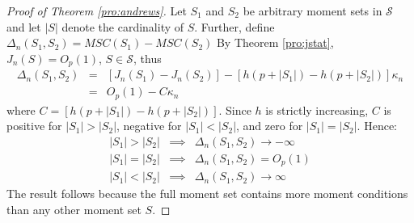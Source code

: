 \begin{proof}[Proof of Theorem \ref{pro:andrews}]
Let $S_1$ and $S_2$ be arbitrary moment sets in $\mathscr{S}$ and let $|S|$ denote the cardinality of $S$. 
Further, define $\Delta_n(S_1, S_2) = MSC(S_1) - MSC(S_2)$
By Theorem \ref{pro:jstat}, $J_n(S) = O_p(1)$, $S \in \mathscr{S}$, thus
	\begin{eqnarray*}
			\Delta_n(S_1, S_2)	&=&   \left[J_{n}(S_1) - J_{n}(S_2)\right] - \left[h\left(p+|S_1|\right) - h\left(p+|S_2|\right)\right]\kappa_n\\
				&=& O_p(1) - C\kappa_n
	\end{eqnarray*}
where $C = \left[h\left(p+|S_1|\right) - h\left(p+|S_2|\right)\right]$. 
Since $h$ is strictly increasing, $C$ is positive for $|S_1|>|S_2|$, negative for $|S_1|<|S_2|$, and zero for $|S_1|=|S_2|$. 
Hence:
	\begin{eqnarray*}
		|S_1|>|S_2|&\implies& \Delta_n(S_1, S_2)  \rightarrow -\infty\\
		|S_1|=|S_2|&\implies&\Delta_n(S_1, S_2)  = O_p(1)\\
		|S_1|<|S_2|&\implies& \Delta_n(S_1, S_2)  \rightarrow \infty
\end{eqnarray*}
The result follows because the full moment set contains more moment conditions than any other moment set $S$.
\end{proof}

